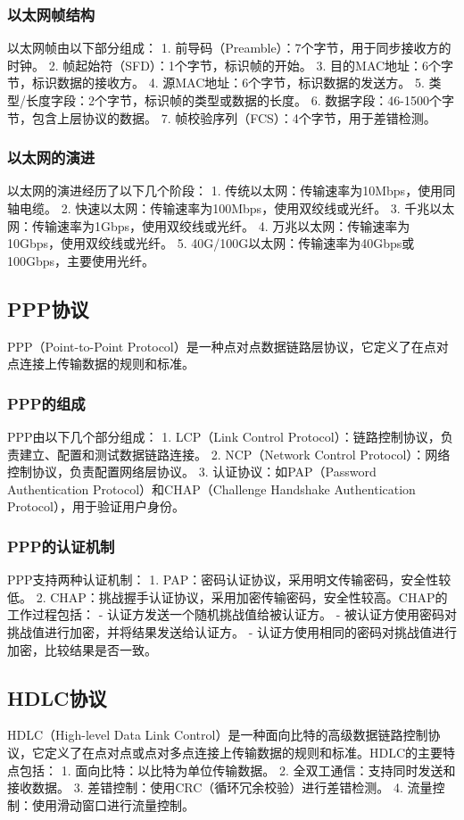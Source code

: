 \documentclass{book}
\begin{document}
\subsubsection{以太网帧结构}
以太网帧由以下部分组成：
1. 前导码（Preamble）：7个字节，用于同步接收方的时钟。
2. 帧起始符（SFD）：1个字节，标识帧的开始。
3. 目的MAC地址：6个字节，标识数据的接收方。
4. 源MAC地址：6个字节，标识数据的发送方。
5. 类型/长度字段：2个字节，标识帧的类型或数据的长度。
6. 数据字段：46-1500个字节，包含上层协议的数据。
7. 帧校验序列（FCS）：4个字节，用于差错检测。
\subsubsection{以太网的演进}
以太网的演进经历了以下几个阶段：
1. 传统以太网：传输速率为10Mbps，使用同轴电缆。
2. 快速以太网：传输速率为100Mbps，使用双绞线或光纤。
3. 千兆以太网：传输速率为1Gbps，使用双绞线或光纤。
4. 万兆以太网：传输速率为10Gbps，使用双绞线或光纤。
5. 40G/100G以太网：传输速率为40Gbps或100Gbps，主要使用光纤。
\subsection{PPP协议}
PPP（Point-to-Point Protocol）是一种点对点数据链路层协议，它定义了在点对点连接上传输数据的规则和标准。
\subsubsection{PPP的组成}
PPP由以下几个部分组成：
1. LCP（Link Control Protocol）：链路控制协议，负责建立、配置和测试数据链路连接。
2. NCP（Network Control Protocol）：网络控制协议，负责配置网络层协议。
3. 认证协议：如PAP（Password Authentication Protocol）和CHAP（Challenge Handshake Authentication Protocol），用于验证用户身份。
\subsubsection{PPP的认证机制}
PPP支持两种认证机制：
1. PAP：密码认证协议，采用明文传输密码，安全性较低。
2. CHAP：挑战握手认证协议，采用加密传输密码，安全性较高。CHAP的工作过程包括：
   - 认证方发送一个随机挑战值给被认证方。
   - 被认证方使用密码对挑战值进行加密，并将结果发送给认证方。
   - 认证方使用相同的密码对挑战值进行加密，比较结果是否一致。
\subsection{HDLC协议}
HDLC（High-level Data Link Control）是一种面向比特的高级数据链路控制协议，它定义了在点对点或点对多点连接上传输数据的规则和标准。HDLC的主要特点包括：
1. 面向比特：以比特为单位传输数据。
2. 全双工通信：支持同时发送和接收数据。
3. 差错控制：使用CRC（循环冗余校验）进行差错检测。
4. 流量控制：使用滑动窗口进行流量控制。
\end{document}
